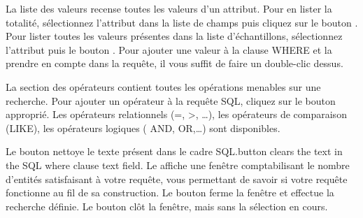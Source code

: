 La liste des valeurs recense toutes les valeurs d'un attribut. Pour en lister la totalité, sélectionnez l'attribut dans la liste de champs puis cliquez sur le bouton . Pour lister toutes les valeurs présentes dans la liste d'échantillons, sélectionnez l'attribut puis le bouton . Pour ajouter une valeur à la clause WHERE et la prendre en compte dans la requête, il vous suffit de faire un double-clic dessus.

La section des opérateurs contient toutes les opérations menables sur une recherche. Pour ajouter un opérateur à la requête SQL, cliquez sur le bouton approprié. Les opérateurs relationnels (=, >, \dots), les opérateurs de comparaison (LIKE), les opérateurs logiques ( AND, OR,\dots) sont disponibles.

Le bouton  nettoye le texte présent dans le cadre SQL.button clears the text in the SQL where clause text field. Le  affiche une fenêtre comptabilisant le nombre d'entités satisfaisant à votre requête, vous permettant de savoir si votre requête fonctionne au fil de sa construction. Le bouton  ferme la fenêtre et effectue la recherche définie. Le bouton  clôt la fenêtre, mais sans la sélection en cours.


